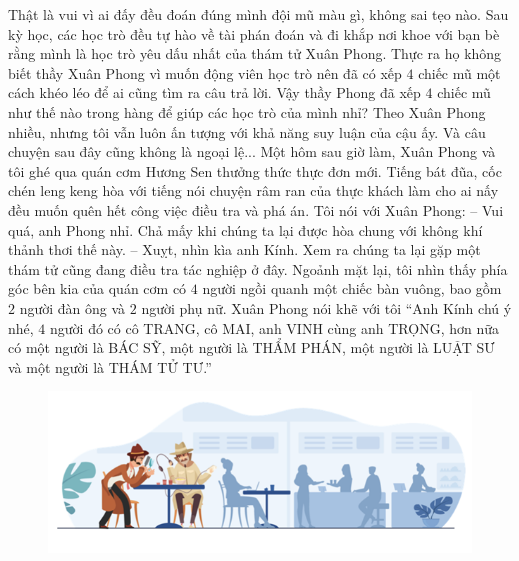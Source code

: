 	\vskip 0.1cm
	Thật là vui vì ai đấy đều đoán đúng mình đội mũ màu gì, không sai tẹo nào. Sau kỳ học, các học trò đều tự hào về tài phán đoán và đi khắp nơi khoe với bạn bè rằng mình là học trò yêu dấu nhất của thám tử Xuân Phong. Thực ra họ không biết thầy Xuân Phong vì muốn động viên học trò nên đã có xếp $4$ chiếc mũ một cách khéo léo để ai cũng tìm ra câu trả lời. 
	\vskip 0.1cm
	Vậy thầy Phong đã xếp $4$ chiếc mũ như thế nào trong hàng để giúp các học trò của mình nhỉ? 
	\vskip 0.1cm
	Theo Xuân Phong nhiều, nhưng tôi vẫn luôn ấn tượng với khả năng suy luận của cậu ấy. Và câu chuyện sau đây cũng không là ngoại lệ...
	\vskip 0.1cm
	{\color{red}{VỊ THÁM TỬ ẨN DANH}}
	\vskip 0.1cm
	Một hôm sau giờ làm, Xuân Phong và tôi ghé qua quán cơm Hương Sen thưởng thức thực đơn mới. Tiếng bát đũa, cốc chén leng keng hòa với tiếng nói chuyện râm ran của thực khách làm cho ai nấy đều muốn quên hết công việc điều tra và phá án. 
	\vskip 0.1cm
	Tôi nói với Xuân Phong: 
	\vskip 0.1cm
	-- Vui quá, anh Phong nhỉ. Chả mấy khi chúng ta lại được hòa chung với không khí thảnh thơi thế này. 
	\vskip 0.1cm
	-- Xuỵt, nhìn kìa anh Kính. Xem ra chúng ta lại gặp một thám tử cũng đang điều tra tác nghiệp ở đây. 
	\vskip 0.1cm
	Ngoảnh mặt lại, tôi nhìn thấy phía góc bên kia của quán cơm có $4$ người ngồi quanh một chiếc bàn vuông, bao gồm $2$ người đàn ông và $2$ người phụ nữ. Xuân Phong nói khẽ với tôi “Anh Kính chú ý nhé, $4$ người đó có cô TRANG, cô MAI, anh VINH cùng anh TRỌNG, hơn nữa có một người là BÁC SỸ, một người là THẨM PHÁN, một người là LUẬT SƯ và một người là THÁM TỬ TƯ.” 
	\begin{figure}[H]
			\centering
			\vspace*{-5pt}
			\captionsetup{labelformat= empty, justification=centering}
			\includegraphics[width=1\linewidth]{4}
			\vspace*{-15pt}
		\end{figure}
